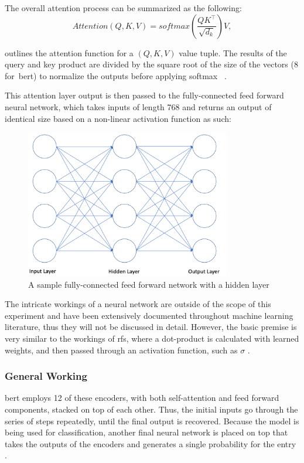 \documentclass[12pt]{article}
\begin{document}
The overall attention process can be summarized as the following:
\begin{equation}
\label{eq:attention}
Attention\left(Q, K, V\right) = softmax\left(\frac{QK^\top}{\sqrt{d_k}}\right)V, 
\end{equation}

 outlines the attention function for a $(Q,K,V)$ value tuple. The results of the query and key product are divided by the square root of the size of the vectors (8 for~\acrshort{bert}) to normalize the outputs before applying softmax ~\parencite{transformers:}.

This attention layer output is then passed to the fully-connected feed forward neural network, which takes inputs of length 768 and returns an output of identical size based on a non-linear activation function as such:

\begin{figure}[H]
\centering
\includegraphics[width=0.8\textwidth]{fig/full_neural.png}
\caption{A sample fully-connected feed forward network with a hidden layer}
\label{fig:neural-network}
\end{figure}

The intricate workings of a neural network are outside of the scope of this experiment and have been extensively documented throughout machine learning literature, thus they will not be discussed in detail. However, the basic premise is very similar to the workings of \acrshort{rfs}, where a dot-product is calculated with learned weights, and then passed through an activation function, such as $\sigma$ \parencite{lecun2015deep}.

\subsubsection{General Working}
\acrshort{bert} employs 12 of these encoders, with both self-attention and feed forward components, stacked on top of each other. Thus, the initial inputs go through the series of steps repeatedly, until the final output is recovered. Because the model is being used for classification, another final neural network is placed on top that takes the outputs of the encoders and generates a single probability for the entry \parencite{sun2019finetune}.
\end{document}
